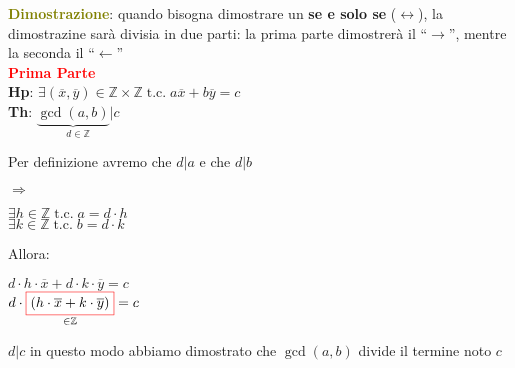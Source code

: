 \begin{boxA}
    \textcolor{olive}{\textbf{Dimostrazione}}: quando bisogna dimostrare un \textbf{se e solo se} ($\longleftrightarrow$), la dimostrazine sarà divisia in due parti: la prima parte dimostrerà il ``$\rightarrow$'', mentre la seconda il ``$\leftarrow$'' \\ \newline
    \textcolor{red}{\textbf{Prima Parte}} \\
    \textbf{Hp}: $\exists (\overline{x}, \overline{y}) \in \mathbb{Z} \times \mathbb{Z} \; \text{t.c.} \; a\overline{x} + b\overline{y} = c$ \\
    \textbf{Th}: $\underset{d \in \mathbb{Z}}{\underbrace{\gcd (a, b)}|c}$
    
    \begin{center}
        \centering
        \begin{minipage}[t]{0.4\textwidth}
            Per definizione avremo che $d|a$ e che $d|b$
        \end{minipage}
        $\Rightarrow$
        \begin{minipage}[t]{0.4\textwidth}
            \centering
            $\exists h \in \mathbb{Z} \; \text{t.c.} \; a = d \cdot h$ \\
            $\exists k \in \mathbb{Z} \; \text{t.c.} \; b = d \cdot k$
        \end{minipage}
    \end{center}
    Allora:
    \begin{center}
        \centering
        \begin{minipage}[t]{0.4\textwidth}
            \centering
            $d \cdot h \cdot \overline{x} + d \cdot k \cdot \overline{y} = c$ \\
            $d \cdot \underset{\in \mathbb{Z}}{\fcolorbox{red}{white}{$(h \cdot \overline{x} + k \cdot \overline{y})$}} = c$
        \end{minipage}
        \begin{minipage}[t]{0.5\textwidth}
            \centering
            $d|c$ in questo modo abbiamo dimostrato che $\gcd (a, b)$ divide il termine noto $c$
        \end{minipage}
    \end{center}
\end{boxA}

